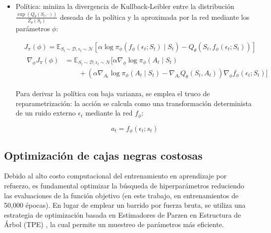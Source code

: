 \documentclass[11pt,a4paper]{article}
\begin{document}
\begin{itemize}
			\item Política: miniiza la divergencia de Kullback-Leibler entre la distribución $\frac{\exp(Q_\theta(S_t, \cdot))}{Z_\theta(S_t)}$ deseada de la política y la aproximada por la red mediante los parámetros $\phi$:
			
			\begin{align}
			& J_\pi(\phi) = \mathbb{E}_{S_t \sim \mathcal{D}, \epsilon_t \sim \mathcal{N}} \left[ \alpha \log \pi_\phi(f_\phi(\epsilon_t; S_t) \mid S_t) - Q_\theta(S_t, f_\phi(\epsilon_t; S_t)) \right] \\
			& \begin{aligned}
			\nabla_\phi J_\pi(\phi) &= \mathbb{E}_{S_t \sim \mathcal{D}, \epsilon_t \sim \mathcal{N}} \bigg[ \alpha \nabla_\phi \log \pi_\phi(A_t \mid S_t) \\
			&\qquad + \left( \alpha \nabla_{A_t} \log \pi_\phi(A_t \mid S_t) - \nabla_{A_t} Q_\theta(S_t, A_t) \right) \nabla_\phi f_\phi(\epsilon_t; S_t) \bigg]
			\end{aligned}
			\end{align}
			
			Para derivar la política con baja varianza, se emplea el truco de reparametrización: la acción se calcula como una transformación determinista de un ruido externo $\epsilon_t$ mediante la red $f_\phi$:
			
			\begin{equation}
			a_t = f_\phi(\epsilon_t ; s_t)
			\end{equation}
		\end{itemize}
	\subsection{Optimización de cajas negras costosas}
	Debido al alto costo computacional del entrenamiento en aprendizaje por refuerzo, es fundamental optimizar la búsqueda de hiperparámetros reduciendo las evaluaciones de la función objetivo (en este trabajo, en entrenamientos de 50,000 épocas). En lugar de emplear un barrido por fuerza bruta, se utiliza una estrategia de optimización basada en Estimadores de Parzen en Estructura de Árbol (TPE) \cite{NIPS2011_86e8f7ab}, la cual permite un muestreo de parámetros más eficiente.
	\newline
	
\end{document}
